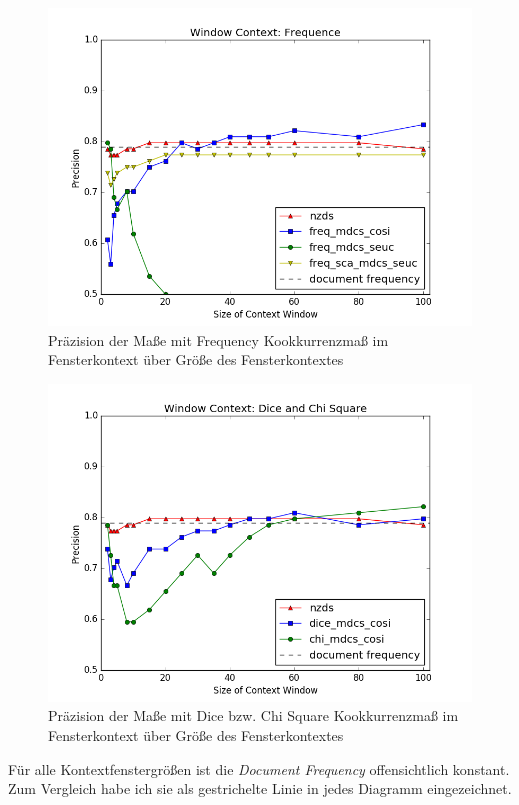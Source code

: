 \documentclass[11pt,numbers=noenddot]{scrartcl}
\begin{document}
\begin{figure}
    \includegraphics[width = \textwidth]{win_freq}
    \caption{Präzision der Maße mit Frequency Kookkurrenzmaß im Fensterkontext über Größe des Fensterkontextes}
    \label{win_freq}
\end{figure}
\begin{figure}
    \includegraphics[width = \textwidth]{win_dice_chi}
    \caption{Präzision der Maße mit Dice bzw. Chi Square Kookkurrenzmaß im Fensterkontext über Größe des Fensterkontextes}
    \label{win_dice_chi}
\end{figure}
Für alle Kontextfenstergrößen ist die \emph{Document Frequency} offensichtlich konstant. Zum Vergleich habe ich sie als gestrichelte Linie in jedes Diagramm eingezeichnet.
\end{document}
